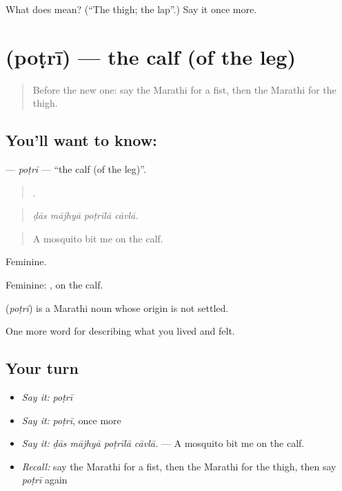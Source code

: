\begin{tcolorbox}[breakable,colback=teal!4,colframe=teal!35!black,title={Before you move on}]
What does  mean? (\textquotedblleft{}The thigh; the lap\textquotedblright{}.) Say it once more.
\end{tcolorbox}
\section[\texorpdfstring{\mr{पोटरी} (poṭrī)}{पोटरी (poṭrī)}]{ (poṭrī) — the calf (of the leg)}

\label{lesson:MR-C477-potri}



\begin{quote}
Before the new one: say the Marathi for a fist, then the Marathi for the thigh.
\end{quote}

\subsection*{You'll want to know: }
\textbf{} — \emph{poṭrī} — \textquotedblleft{}the calf (of the leg)\textquotedblright{}.

\begin{quote}
   .
\end{quote}

\begin{quote}
\emph{ḍās mājhyā poṭrīlā cāvlā.}
\end{quote}

\begin{quote}
A mosquito bit me on the calf.
\end{quote}

Feminine.

Feminine: , on the calf.

\begin{cousinweb}
\textbf{} (\emph{poṭrī}) is a Marathi noun whose origin is not settled.
\end{cousinweb}

\begin{grammarlens}[title={What you've built}]
One more word for describing what you lived and felt.
\end{grammarlens}

\subsection*{Your turn}
\begin{itemize}
\raggedright
  \item \emph{Say it:} \emph{poṭrī}
  \item \emph{Say it:} \emph{poṭrī}, once more
  \item \emph{Say it:} \emph{ḍās mājhyā poṭrīlā cāvlā.} — A mosquito bit me on the calf.
  \item \emph{Recall:} say the Marathi for a fist, then the Marathi for the thigh, then say \emph{poṭrī} again
\end{itemize}

